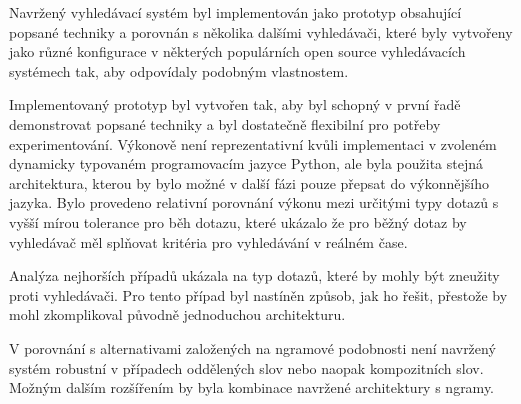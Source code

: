 \documentclass[11pt,letterpaper,oneside,openright]{book}
\begin{document}
Navržený vyhledávací systém byl implementován jako prototyp obsahující popsané
techniky a porovnán s několika dalšími vyhledávači, které byly vytvořeny jako
různé konfigurace v některých populárních open source vyhledávacích systémech
tak, aby odpovídaly podobným vlastnostem.

Implementovaný prototyp byl vytvořen tak, aby byl schopný v první řadě
demonstrovat popsané techniky a byl dostatečně flexibilní pro potřeby
experimentování. Výkonově není reprezentativní kvůli implementaci v zvoleném
dynamicky typovaném programovacím jazyce Python, ale byla použita stejná
architektura, kterou by bylo možné v další fázi pouze přepsat do výkonnějšího
jazyka. Bylo provedeno relativní porovnání výkonu mezi určitými typy dotazů s
vyšší mírou tolerance pro běh dotazu, které ukázalo že pro běžný dotaz by
vyhledávač měl splňovat kritéria pro vyhledávání v reálném čase.

Analýza nejhorších případů ukázala na typ dotazů, které by mohly být zneužity
proti vyhledávači. Pro tento případ byl nastíněn způsob, jak ho řešit, přestože
by mohl zkomplikoval původně jednoduchou architekturu.

V porovnání s alternativami založených na ngramové podobnosti není navržený
systém robustní v případech oddělených slov nebo naopak kompozitních slov.
Možným dalším rozšířením by byla kombinace navržené architektury s ngramy.



\renewcommand{\refname}{Reference}
\renewcommand{\bibname}{Reference}
\setlength{\bibsep}{0pt}

\end{document}
